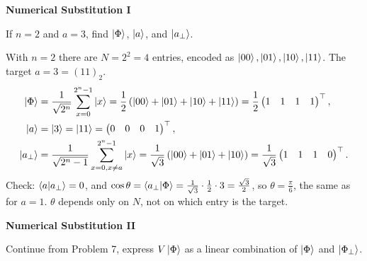 \documentclass[a4paper, 10pt]{article}
\begin{document}
\begin{problem}
\textbf{Numerical Substitution I}
\par If \( n = 2 \) and \( a = 3 \), find \( \ket{\Phi} \), \( \ket{a} \), and \( \ket{a_\perp} \).
\end{problem}

\begin{solution}
	\noindent With \( n = 2 \) there are \( N = 2^2 = 4 \) entries, encoded as \( \ket{00}, \ket{01}, \ket{10}, \ket{11} \). The target \( a = 3 = (11)_2 \).
	\begin{align*}
		\ket{\Phi}    & = \frac{1}{\sqrt{2^n}}\sum_{x = 0}^{2^n - 1}\ket{x} = \frac{1}{2}\left(\ket{00} + \ket{01} + \ket{10} + \ket{11}\right) = \frac{1}{2}\begin{pmatrix} 1 & 1 & 1 & 1 \end{pmatrix}^{\top},                  \\
		\ket{a}       & = \ket{3} = \ket{11} = \begin{pmatrix} 0 & 0 & 0 & 1 \end{pmatrix}^{\top},                                                                                                                           \\
		\ket{a_\perp} & = \frac{1}{\sqrt{2^n - 1}}\sum_{x = 0, x \neq a}^{2^n - 1}\ket{x} = \frac{1}{\sqrt{3}}\left(\ket{00} + \ket{01} + \ket{10}\right) = \frac{1}{\sqrt{3}}\begin{pmatrix} 1 & 1 & 1 & 0 \end{pmatrix}^{\top}.
	\end{align*}
	Check: \( \braket{a \vert a_\perp} = 0 \), and \( \cos\theta = \braket{a_\perp \vert \Phi} = \tfrac{1}{\sqrt{3}} \cdot \tfrac{1}{2} \cdot 3 = \tfrac{\sqrt{3}}{2} \), so \( \theta = \tfrac{\pi}{6} \), the same as for \( a = 1 \).
	\( \theta \) depends only on \( N \), not on which entry is the target.
\end{solution}

\begin{problem}
\textbf{Numerical Substitution II}
\par Continue from Problem 7, express \( V\ket{\Phi} \) as a linear combination of \( \ket{\Phi} \) and \( \ket{\Phi_\perp} \).
\end{problem}
\end{document}
